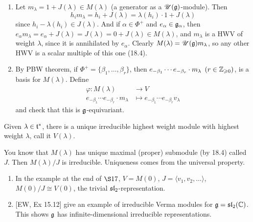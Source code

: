 \documentclass{article}
\begin{document}
\proof \hspace{0.1cm}
\begin{enumerate}
    \item Let $m_{\lambda} = 1+ J(\lambda) \in M(\lambda)$ (a generator as a $\mathscr{U}(\mathfrak{g})$-module). Then \[ h_{i}m_{\lambda} = h_{i} + J(\lambda) = \lambda(h_{i}) \cdot 1 + J(\lambda) \] since $h_{i} - \lambda(h_{i}) \in J(\lambda)$. \gap And if $\alpha \in \Phi^{+}$ and $e_{\alpha} \in \mathfrak{g}_{\alpha}$, then $e_{\alpha}m_{\lambda} = e_{\alpha} + J(\lambda) = J(\lambda) = 0 + J(\lambda) \in M(\lambda)$, and $m_{\lambda}$ is a HWV of weight $\lambda$, since it is annihilated by $e_{\alpha}$. Clearly $M(\lambda) = \mathscr{U}(\mathfrak{g})m_{\lambda}$, so any other HWV is a scalar multiple of this one (18.4).
    \item By PBW theorem, if $\Phi^{+} = \{\beta_{1}, \dots, \beta_{r}\}$, then $e_{-\beta_{1}}\cdots e_{-\beta_{r}} \cdot m_{\lambda} \,\,\, (r \in \mathbb{Z}_{\geqslant 0})$, is a basis for $M(\lambda)$. Define \begin{align*}
        \varphi: M(\lambda) &\to V\\
        e_{-\beta_{1}} \cdots e_{-\beta_{r}} \cdot m_{\lambda} &\mapsto e_{-\beta_{1}} \cdots e_{-\beta_{r}} v_{\lambda}
    \end{align*}
    and check that this is $\mathfrak{g}$-equivariant.
\end{enumerate}
\begin{fancylem}{}
    Given $\lambda \in \mathfrak{t}^{*}$, there is a unique irreducible highest weight module with highest weight $\lambda$, call it $V(\lambda)$.
\end{fancylem}
\proof You know that $M(\lambda)$ has unique maximal (proper) submodule (by 18.4) called $J$. Then $M(\lambda)/J$ is irreducible. Uniqueness comes from the universal property. \endproof
\begin{exs*}\hspace{0.1cm}
    \begin{enumerate}
        \item In the example at the end of $\S 17$, $V=M(0)$, $J= \langle v_{1}, v_{2}, \dots \rangle$, $M(0)/J \cong V(0)$, the trivial $\mathfrak{sl}_{2}$-representation.
        \item {[}EW, Ex 15.12{]} give an example of irreducible Verma modules for $\mathfrak{g}= \mathfrak{sl}_{2}(\mathbb{C})$. This shows $\mathfrak{g}$ has infinite-dimensional irreducible representations.
    \end{enumerate}
\end{exs*}
\end{document}
